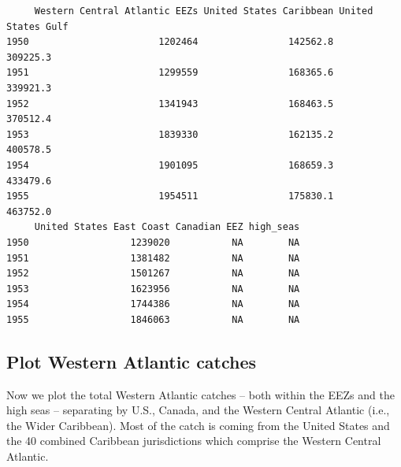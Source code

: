 \documentclass[
]{article}
\begin{document}
\begin{verbatim}
     Western Central Atlantic EEZs United States Caribbean United States Gulf
1950                       1202464                142562.8           309225.3
1951                       1299559                168365.6           339921.3
1952                       1341943                168463.5           370512.4
1953                       1839330                162135.2           400578.5
1954                       1901095                168659.3           433479.6
1955                       1954511                175830.1           463752.0
     United States East Coast Canadian EEZ high_seas
1950                  1239020           NA        NA
1951                  1381482           NA        NA
1952                  1501267           NA        NA
1953                  1623956           NA        NA
1954                  1744386           NA        NA
1955                  1846063           NA        NA
\end{verbatim}

\subsection{Plot Western Atlantic
catches}\label{plot-western-atlantic-catches}

Now we plot the total Western Atlantic catches -- both within the EEZs
and the high seas -- separating by U.S., Canada, and the Western Central
Atlantic (i.e., the Wider Caribbean). Most of the catch is coming from
the United States and the 40 combined Caribbean jurisdictions which
comprise the Western Central Atlantic.
\end{document}
